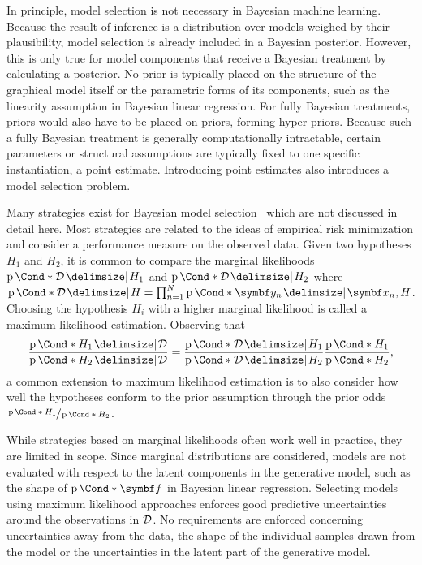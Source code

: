 In principle, model selection is not necessary in Bayesian machine learning.
Because the result of inference is a distribution over models weighed by their plausibility, model selection is already included in a Bayesian posterior.
However, this is only true for model components that receive a Bayesian treatment by calculating a posterior.
No prior is typically placed on the structure of the graphical model itself or the parametric forms of its components, such as the linearity assumption in Bayesian linear regression.
For fully Bayesian treatments, priors would also have to be placed on priors, forming hyper-priors.
Because such a fully Bayesian treatment is generally computationally intractable, certain parameters or structural assumptions are typically fixed to one specific instantiation, a point estimate.
Introducing point estimates also introduces a model selection problem.

Many strategies exist for Bayesian model selection~\parencite{andrew_gelman_bayesian_2013,murphy_machine_2012,david_barber_bayesian_2012} which are not discussed in detail here.
Most strategies are related to the ideas of empirical risk minimization and consider a performance measure on the observed data.
Given two hypotheses $H_1$ and $H_2$, it is common to compare the marginal likelihoods $\Prob*{\Dc \given H_1}$ and $\Prob*{\Dc \given H_2}$ where $\Prob*{\Dc \given H} = \prod_{n=1}^N \Prob*{\mat{y}_n \given \mat{x}_n, H}$.
Choosing the hypothesis $H_i$ with a higher marginal likelihood is called a maximum likelihood estimation.
Observing that
\begin{equation}
    \begin{split}
        \frac{\Prob*{H_1 \given \Dc}}{\Prob*{H_2 \given \Dc}} = \frac{\Prob*{\Dc \given H_1}}{\Prob*{\Dc \given H_2}} \frac{\Prob*{H_1}}{\Prob*{H_2}},
    \end{split}
\end{equation}
a common extension to maximum likelihood estimation is to also consider how well the hypotheses conform to the prior assumption through the prior odds $\sfrac{\Prob*{H_1}}{\Prob*{H_2}}$.

While strategies based on marginal likelihoods often work well in practice, they are limited in scope.
Since marginal distributions are considered, models are not evaluated with respect to the latent components in the generative model, such as the shape of $\Prob*{\mat{f}}$ in Bayesian linear regression.
Selecting models using maximum likelihood approaches enforces good predictive uncertainties around the observations in $\mathcal{D}$.
No requirements are enforced concerning uncertainties away from the data, the shape of the individual samples drawn from the model or the uncertainties in the latent part of the generative model.

